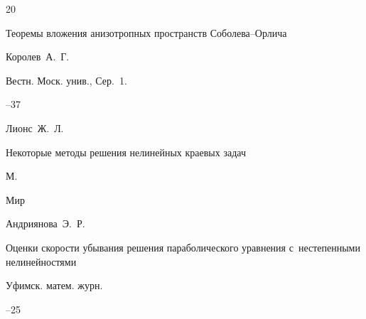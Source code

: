 \begin{thebibliography}{20}

\paper Теоремы вложения анизотропных пространств Соболева--Орлича

\by Королев~А.~Г.

\jour Вестн. Моск. унив., Сер.~1.



--37










\by Лионс~Ж.~Л.

\book Некоторые методы решения нелинейных краевых задач

\publaddr М.

\publ  Мир









\by Андриянова~Э.~Р.

\paper Оценки скорости убывания решения параболического уравнения с~нестепенными нелинейностями

\jour Уфимск. матем. журн.




--25












\end{thebibliography}



